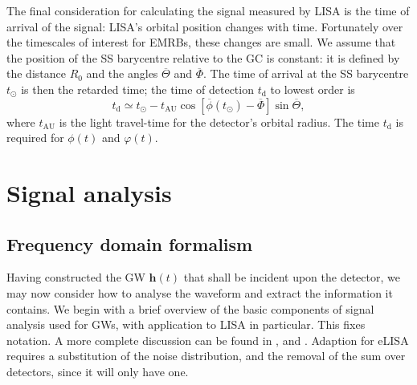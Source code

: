 \documentclass[useAMS,usedcolumn,usegraphicx,usenatbib]{mn2e}
\newcommand{\sub}[1]{\ensuremath{_\mathrm{#1}}}
\begin{document}
The final consideration for calculating the signal measured by LISA is the time of arrival of the signal: LISA's orbital position changes with time. Fortunately over the timescales of interest for EMRBs, these changes are small. We assume that the position of the SS barycentre relative to the GC is constant: it is defined by the distance $R_0$ and the angles $\overline{\Theta}$ and $\overline{\Phi}$. The time of arrival at the SS barycentre $t_\odot$ is then the retarded time; the time of detection $t\sub{d}$ to lowest order is
\begin{equation}
t\sub{d} \simeq t_\odot - t\sub{AU}\cos\left[\overline{\phi}(t_\odot) - \overline{\Phi}\right]\sin\overline{\Theta},
\end{equation}
where $t\sub{AU}$ is the light travel-time for the detector's orbital radius. The time $t\sub{d}$ is required for $\phi(t)$ and $\varphi(t)$.

\section{Signal analysis}\label{sec:Signal}

\subsection{Frequency domain formalism}

Having constructed the GW $\boldsymbol{h}(t)$ that shall be incident upon the detector, we may now consider how to analyse the waveform and extract the information it contains. We begin with a brief overview of the basic components of signal analysis used for GWs, with application to LISA in particular. This fixes notation. A more complete discussion can be found in \citet{Finn1992}, and \citet{Cutler1994}. Adaption for eLISA requires a substitution of the noise distribution, and the removal of the sum over detectors, since it will only have one.
\end{document}
